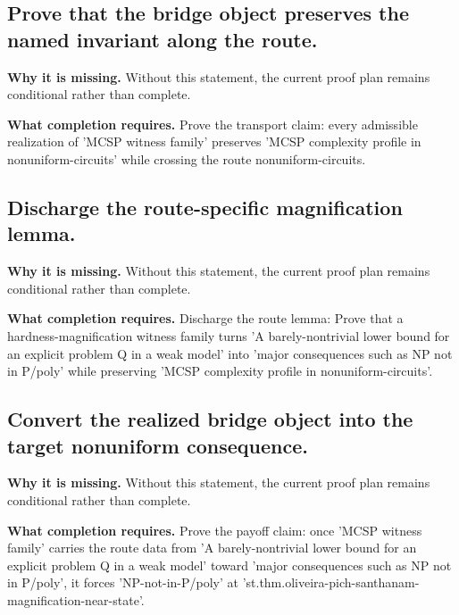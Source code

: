 \documentclass[11pt]{article}
\begin{document}
\subsection*{Prove that the bridge object preserves the named invariant along the route.}
\textbf{Why it is missing.} Without this statement, the current proof plan remains conditional rather than complete.

\textbf{What completion requires.} Prove the transport claim: every admissible realization of 'MCSP witness family' preserves 'MCSP complexity profile in nonuniform-circuits' while crossing the route nonuniform-circuits.
\subsection*{Discharge the route-specific magnification lemma.}
\textbf{Why it is missing.} Without this statement, the current proof plan remains conditional rather than complete.

\textbf{What completion requires.} Discharge the route lemma: Prove that a hardness-magnification witness family turns 'A barely-nontrivial lower bound for an explicit problem Q in a weak model' into 'major consequences such as NP not in P/poly' while preserving 'MCSP complexity profile in nonuniform-circuits'.
\subsection*{Convert the realized bridge object into the target nonuniform consequence.}
\textbf{Why it is missing.} Without this statement, the current proof plan remains conditional rather than complete.

\textbf{What completion requires.} Prove the payoff claim: once 'MCSP witness family' carries the route data from 'A barely-nontrivial lower bound for an explicit problem Q in a weak model' toward 'major consequences such as NP not in P/poly', it forces 'NP-not-in-P/poly' at 'st.thm.oliveira-pich-santhanam-magnification-near-state'.
\end{document}
